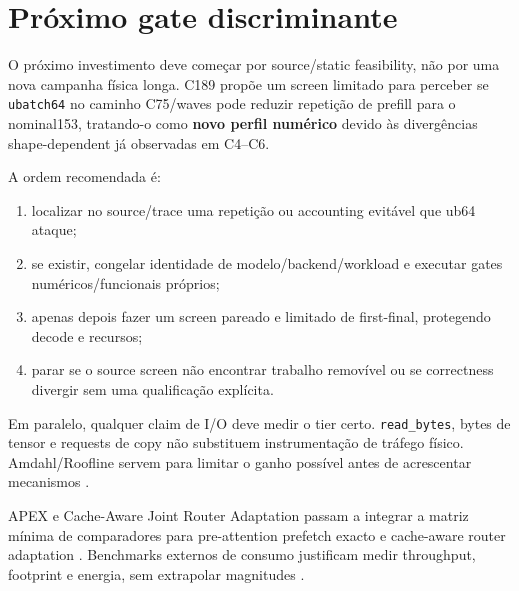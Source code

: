 \section{Próximo gate discriminante}
O próximo investimento deve começar por source/static feasibility, não por uma nova campanha física longa. C189 propõe um screen limitado para perceber se \texttt{ubatch64} no caminho C75/waves pode reduzir repetição de prefill para o nominal153, tratando-o como \textbf{novo perfil numérico} devido às divergências shape-dependent já observadas em C4--C6. 

A ordem recomendada é:
\begin{enumerate}
\item localizar no source/trace uma repetição ou accounting evitável que ub64 ataque;
\item se existir, congelar identidade de modelo/backend/workload e executar gates numéricos/funcionais próprios;
\item apenas depois fazer um screen pareado e limitado de first-final, protegendo decode e recursos;
\item parar se o source screen não encontrar trabalho removível ou se correctness divergir sem uma qualificação explícita.
\end{enumerate}

Em paralelo, qualquer claim de I/O deve medir o tier certo. \texttt{read\_bytes}, bytes de tensor e requests de copy não substituem instrumentação de tráfego físico. Amdahl/Roofline servem para limitar o ganho possível antes de acrescentar mecanismos \cite{amdahl1967validity,williams2009roofline}.

APEX e Cache-Aware Joint Router Adaptation passam a integrar a matriz mínima de comparadores para pre-attention prefetch exacto e cache-aware router adaptation \cite{kanani2026apex,wu2026cacheaware}. Benchmarks externos de consumo justificam medir throughput, footprint e energia, sem extrapolar magnitudes \cite{alfarizy2026consumer}.
